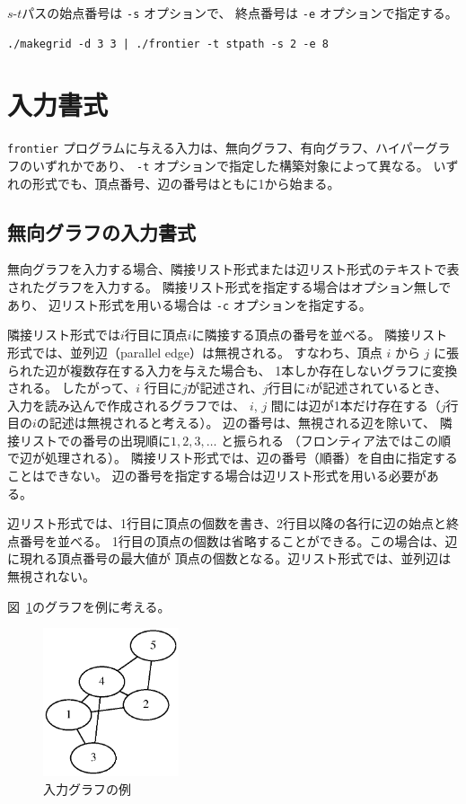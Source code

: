 \documentclass{jsarticle}
\begin{document}
$s$-$t$パスの始点番号は \texttt{-s} オプションで、
終点番号は \texttt{-e} オプションで指定する。

\begin{verbatim}
./makegrid -d 3 3 | ./frontier -t stpath -s 2 -e 8
\end{verbatim}


\section{入力書式}

\texttt{frontier} プログラムに与える入力は、無向グラフ、有向グラフ、ハイパーグラフのいずれかであり、
\texttt{-t} オプションで指定した構築対象によって異なる。
いずれの形式でも、頂点番号、辺の番号はともに1から始まる。

\subsection{無向グラフの入力書式}

無向グラフを入力する場合、隣接リスト形式または辺リスト形式のテキストで表されたグラフを入力する。
隣接リスト形式を指定する場合はオプション無しであり、
辺リスト形式を用いる場合は \texttt{-c} オプションを指定する。

隣接リスト形式では$i$行目に頂点$i$に隣接する頂点の番号を並べる。
隣接リスト形式では、並列辺（parallel edge）は無視される。
すなわち、頂点 $i$ から $j$ に張られた辺が複数存在する入力を与えた場合も、
1本しか存在しないグラフに変換される。
したがって、$i$ 行目に$j$が記述され、$j$行目に$i$が記述されているとき、
入力を読み込んで作成されるグラフでは、
$i$, $j$ 間には辺が1本だけ存在する（$j$行目の$i$の記述は無視されると考える）。
辺の番号は、無視される辺を除いて、
隣接リストでの番号の出現順に$1,2,3,\ldots$ と振られる
（フロンティア法ではこの順で辺が処理される）。
隣接リスト形式では、辺の番号（順番）を自由に指定することはできない。
辺の番号を指定する場合は辺リスト形式を用いる必要がある。

辺リスト形式では、1行目に頂点の個数を書き、2行目以降の各行に辺の始点と終点番号を並べる。
1行目の頂点の個数は省略することができる。この場合は、辺に現れる頂点番号の最大値が
頂点の個数となる。辺リスト形式では、並列辺は無視されない。

図~\ref{fig:graph_example}のグラフを例に考える。

\begin{figure}[h]
  \begin{center}
    \includegraphics[width=40mm]{graph_example.eps}
  \end{center}
  \caption{入力グラフの例}
  \label{fig:graph_example}
\end{figure}
\end{document}

